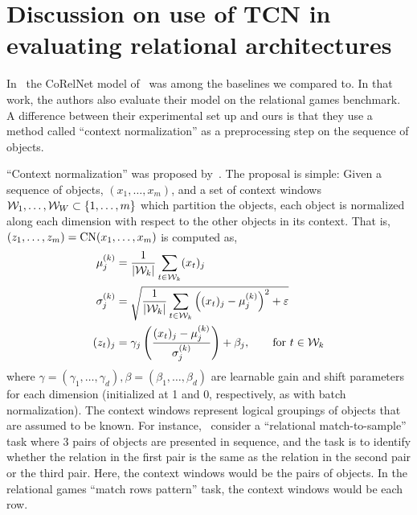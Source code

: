 \section{Discussion on use of TCN in evaluating relational architectures}\label{sec:appendix_tcn_discussion}

In~ the CoRelNet model of~\citet{kergNeuralArchitecture2022} was among the baselines we compared to. In that work, the authors also evaluate their model on the relational games benchmark. A difference between their experimental set up and ours is that they use a method called ``context normalization'' as a preprocessing step on the sequence of objects.

``Context normalization'' was proposed by~\citet{webbLearningRepresentationsThat2020}. The proposal is simple: Given a sequence of objects, $(x_1, \ldots, x_m)$, and a set of context windows ${\mathcal{W}}_1, \ldots, {\mathcal{W}}_W \subset \left\{1, \ldots, m\right\}$ which partition the objects, each object is normalized along each dimension with respect to the other objects in its context. That is, $\left(z_1, \ldots, z_m\right) = \mathrm{CN}(x_1, \ldots, x_m)$ is computed as,
\begin{equation*}
    \begin{split}
        \mu_j^{(k)} &= \frac{1}{\left\lvert{\mathcal{W}}_k\right\rvert} \sum_{t \in {\mathcal{W}}_k} (x_t)_j\\
        \sigma_j^{(k)} &= \sqrt{ \frac{1}{\left\lvert{\mathcal{W}}_k\right\rvert} \sum_{t \in {\mathcal{W}}_k} \left((x_t)_j - \mu_j^{(k)}\right)^2 + \varepsilon}\\
        (z_t)_j &= \gamma_j \left(\frac{(x_t)_j - \mu_j^{(k)}}{\sigma_j^{(k)}}\right) + \beta_j, \qquad \text{for } t \in {\mathcal{W}}_k
    \end{split}
\end{equation*}
where $\gamma = (\gamma_1, \ldots, \gamma_d), \beta = (\beta_1, \ldots, \beta_d)$ are learnable gain and shift parameters for each dimension (initialized at 1 and 0, respectively, as with batch normalization). The context windows represent logical groupings of objects that are assumed to be known. For instance,~\citep{webbEmergentSymbols2021,kergNeuralArchitecture2022} consider a ``relational match-to-sample'' task where 3 pairs of objects are presented in sequence, and the task is to identify whether the relation in the first pair is the same as the relation in the second pair or the third pair. Here, the context windows would be the pairs of objects. In the relational games ``match rows pattern'' task, the context windows would be each row.

